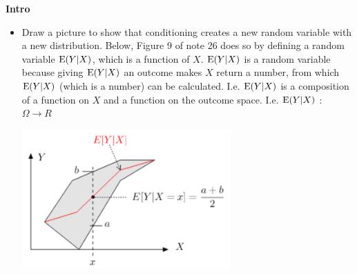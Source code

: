 \item \textbf{Intro}
\begin{itemize}
\item Draw a picture to show that conditioning creates a new random variable with a new distribution. Below, Figure 9 of note 26 does so by defining a random variable $\text{E}(Y | X)$, which is a function of $X$. $\text{E}(Y | X)$ is a random variable because giving $\text{E}(Y | X)$ an outcome makes $X$ return a number, from which $\text{E}(Y | X)$ (which is a number) can be calculated. 
I.e. $\text{E}(Y | X)$ is a composition of a function on $X$ and a function on the outcome space.
I.e. $\text{E}(Y | X)$ : $Ω \rightarrow R$
\begin{center}
\includegraphics[width=8cm]{intro.jpg}
\end{center}
\end{itemize}
